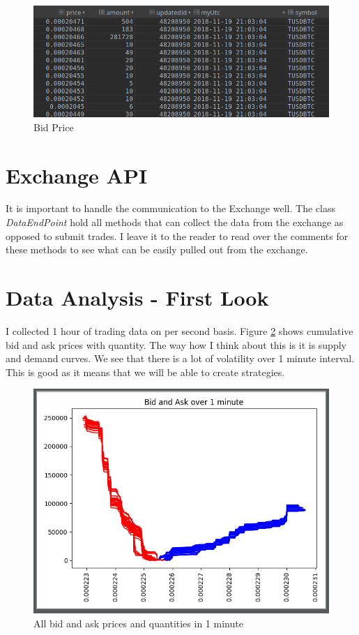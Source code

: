 \documentclass[12pt]{article}
\begin{document}
\begin{figure}[h!]
	\centering
  \includegraphics[scale=0.3]{bid.png}
  \caption{Bid Price}
  \label{fig:bid}
\end{figure}

\section*{Exchange API}
It is important to handle the communication to the Exchange well. The class \textit{DataEndPoint} hold all methods that can collect the data from the exchange as opposed to submit trades. I leave it to the reader to read over the comments for these methods to see what can be easily pulled out from the exchange.

\section*{Data Analysis - First Look}
I collected 1 hour of trading data on per second basis. Figure \ref{fig:plt1} shows cumulative bid and ask prices with quantity. The way how I think about this is it is supply and demand curves. We see that there is a lot of volatility over 1 minute interval. This is good as it means that we will be able to create strategies.
\begin{figure}[h!]
	\centering
  \includegraphics[scale=0.5]{plot1.png}
  \caption{All bid and ask prices and quantities in 1 minute}
  \label{fig:plt1}
\end{figure}
\end{document}
